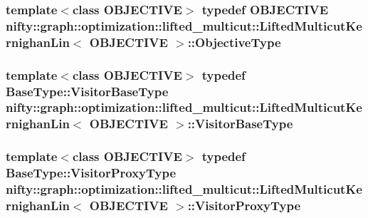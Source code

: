 \subsubsection[{Objective\+Type}]{\setlength{\rightskip}{0pt plus 5cm}template$<$class O\+B\+J\+E\+C\+T\+I\+V\+E$>$ typedef O\+B\+J\+E\+C\+T\+I\+V\+E {\bf nifty\+::graph\+::optimization\+::lifted\+\_\+multicut\+::\+Lifted\+Multicut\+Kernighan\+Lin}$<$ O\+B\+J\+E\+C\+T\+I\+V\+E $>$\+::{\bf Objective\+Type}}\label{classnifty_1_1graph_1_1optimization_1_1lifted__multicut_1_1LiftedMulticutKernighanLin_a79c92cc5c34a03b68eeedf17558b0e93}
\hypertarget{classnifty_1_1graph_1_1optimization_1_1lifted__multicut_1_1LiftedMulticutKernighanLin_aad5914ddfc4336c965ad791c0d0173fa}{}
\subsubsection[{Visitor\+Base\+Type}]{\setlength{\rightskip}{0pt plus 5cm}template$<$class O\+B\+J\+E\+C\+T\+I\+V\+E$>$ typedef {\bf Base\+Type\+::\+Visitor\+Base\+Type} {\bf nifty\+::graph\+::optimization\+::lifted\+\_\+multicut\+::\+Lifted\+Multicut\+Kernighan\+Lin}$<$ O\+B\+J\+E\+C\+T\+I\+V\+E $>$\+::{\bf Visitor\+Base\+Type}}\label{classnifty_1_1graph_1_1optimization_1_1lifted__multicut_1_1LiftedMulticutKernighanLin_aad5914ddfc4336c965ad791c0d0173fa}
\hypertarget{classnifty_1_1graph_1_1optimization_1_1lifted__multicut_1_1LiftedMulticutKernighanLin_a936d52bf3c38146f7fc4e02e1b281ca5}{}
\subsubsection[{Visitor\+Proxy\+Type}]{\setlength{\rightskip}{0pt plus 5cm}template$<$class O\+B\+J\+E\+C\+T\+I\+V\+E$>$ typedef {\bf Base\+Type\+::\+Visitor\+Proxy\+Type} {\bf nifty\+::graph\+::optimization\+::lifted\+\_\+multicut\+::\+Lifted\+Multicut\+Kernighan\+Lin}$<$ O\+B\+J\+E\+C\+T\+I\+V\+E $>$\+::{\bf Visitor\+Proxy\+Type}}\label{classnifty_1_1graph_1_1optimization_1_1lifted__multicut_1_1LiftedMulticutKernighanLin_a936d52bf3c38146f7fc4e02e1b281ca5}


